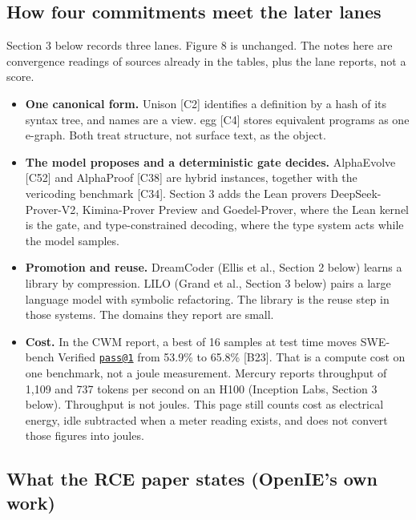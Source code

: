 \documentclass[10pt,letterpaper]{article}
\providecommand{\tightlist}{\setlength{\itemsep}{1pt}\setlength{\parskip}{0pt}}
\begin{document}
\subsection{How four commitments meet the later
lanes}\label{how-four-commitments-meet-the-later-lanes}

Section 3 below records three lanes. Figure 8 is unchanged. The notes
here are convergence readings of sources already in the tables, plus the
lane reports, not a score.

\begin{itemize}
\tightlist
\item
  \textbf{One canonical form.} Unison {[}C2{]} identifies a definition
  by a hash of its syntax tree, and names are a view. egg {[}C4{]}
  stores equivalent programs as one e-graph. Both treat structure, not
  surface text, as the object.
\item
  \textbf{The model proposes and a deterministic gate decides.}
  AlphaEvolve {[}C52{]} and AlphaProof {[}C38{]} are hybrid instances,
  together with the vericoding benchmark {[}C34{]}. Section 3 adds the
  Lean provers DeepSeek-Prover-V2, Kimina-Prover Preview and
  Goedel-Prover, where the Lean kernel is the gate, and type-constrained
  decoding, where the type system acts while the model samples.
\item
  \textbf{Promotion and reuse.} DreamCoder (Ellis et al., Section 2
  below) learns a library by compression. LILO (Grand et al., Section 3
  below) pairs a large language model with symbolic refactoring. The
  library is the reuse step in those systems. The domains they report
  are small.
\item
  \textbf{Cost.} In the CWM report, a best of 16 samples at test time
  moves SWE-bench Verified \href{mailto:pass@1}{\nolinkurl{pass@1}} from
  53.9\% to 65.8\% {[}B23{]}. That is a compute cost on one benchmark,
  not a joule measurement. Mercury reports throughput of 1,109 and 737
  tokens per second on an H100 (Inception Labs, Section 3 below).
  Throughput is not joules. This page still counts cost as electrical
  energy, idle subtracted when a meter reading exists, and does not
  convert those figures into joules.
\end{itemize}

\subsection{What the RCE paper states (OpenIE's own
work)}\label{what-the-rce-paper-states-openies-own-work}
\end{document}

